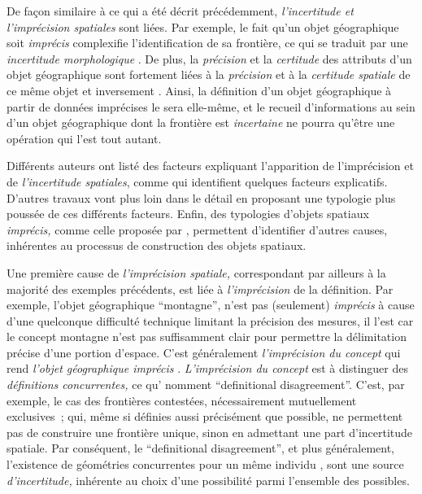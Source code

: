 De façon similaire à ce qui a été décrit précédemment,
\emph{l’incertitude et l’imprécision spatiales} sont liées. Par
exemple, le fait qu’un objet géographique soit \emph{imprécis}
complexifie l’identification de sa frontière, ce qui se traduit par
une \emph{incertitude morphologique} \autocite{Lagacherie1996}. De
plus, la \emph{précision} et la \emph{certitude} des attributs d’un
objet géographique sont fortement liées à la \emph{précision} et à la
\emph{certitude spatiale} de ce même objet et inversement
\autocite{Mark1989}. Ainsi, la définition d’un objet géographique à
partir de données imprécises le sera elle-même, et le recueil
d’informations au sein d’un objet géographique dont la frontière est
\emph{incertaine} ne pourra qu’être une opération qui l’est tout
autant.

Différents auteurs ont listé des facteurs expliquant l’apparition de
\textsf{l’imprécision} et de \emph{l’incertitude spatiales}, comme
\textcite{Freksa1996,Dutton1992} qui identifient quelques facteurs
explicatifs. D’autres travaux \autocite{Hadzilacos1996,Evans2008} vont
plus loin dans le détail en proposant une typologie plus poussée de
ces différents facteurs. Enfin, des typologies d’objets spatiaux
\emph{imprécis,} comme celle proposée par \textcite{Liu2019},
permettent d’identifier d’autres causes, inhérentes au processus de
construction des objets spatiaux.

Une première cause de \emph{l’imprécision spatiale,} correspondant par
ailleurs à la majorité des exemples précédents, est liée à
\emph{l’imprécision }de la définition. Par exemple, l’objet
géographique \enquote{montagne}, n’est pas (seulement) \emph{imprécis}
à cause d’une quelconque difficulté technique limitant la précision
des mesures, il l’est car le concept montagne n’est pas suffisamment
clair pour permettre la délimitation précise d’une portion
d’espace. C’est généralement \emph{l’imprécision du concept} qui rend
\emph{l’objet géographique imprécis}
\autocite{Freksa1996}. \emph{L’imprécision du concept} est à
distinguer des \emph{définitions concurrentes,} ce
qu’\textcite{Evans2008} nomment \enquote{definitional
  disagreement}. C’est, par exemple, le cas des frontières contestées,
nécessairement mutuellement exclusives ; qui, même si définies aussi
précisément que possible, ne permettent pas de construire une
frontière unique, sinon en admettant une part d’incertitude
spatiale. Par conséquent, le \enquote{definitional disagreement}, et
plus généralement, l’existence de géométries concurrentes pour un même
individu \autocite{Hadzilacos1996}, sont une source
\emph{d’incertitude,} inhérente au choix d’une possibilité parmi
l’ensemble des possibles.


